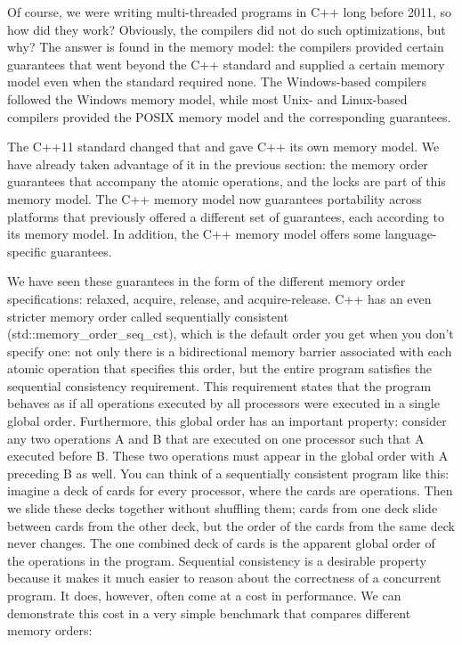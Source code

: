 Of course, we were writing multi-threaded programs in C++ long before 2011, so how did they work? Obviously, the compilers did not do such optimizations, but why? The answer is found in the memory model: the compilers provided certain guarantees that went beyond the C++ standard and supplied a certain memory model even when the standard required none. The Windows-based compilers followed the Windows memory model, while most Unix- and Linux-based compilers provided the POSIX memory model and the corresponding guarantees.

The C++11 standard changed that and gave C++ its own memory model. We have already taken advantage of it in the previous section: the memory order guarantees that accompany the atomic operations, and the locks are part of this memory model. The C++ memory model now guarantees portability across platforms that previously offered a different set of guarantees, each according to its memory model. In addition, the C++ memory model offers some language-specific guarantees.

We have seen these guarantees in the form of the different memory order specifications: relaxed, acquire, release, and acquire-release. C++ has an even stricter memory order called sequentially consistent (std::memory\_order\_seq\_cst), which is the default order you get when you don't specify one: not only there is a bidirectional memory barrier associated with each atomic operation that specifies this order, but the entire program satisfies the sequential consistency requirement. This requirement states that the program behaves as if all operations executed by all processors were executed in a single global order. Furthermore, this global order has an important property: consider any two operations A and B that are executed on one processor such that A executed before B. These two operations must appear in the global order with A preceding B as well. You can think of a sequentially consistent program like this: imagine a deck of cards for every processor, where the cards are operations. Then we slide these decks together without shuffling them; cards from one deck slide between cards from the other deck, but the order of the cards from the same deck never changes. The one combined deck of cards is the apparent global order of the operations in the program. Sequential consistency is a desirable property because it makes it much easier to reason about the correctness of a concurrent program. It does, however, often come at a cost in performance. We can demonstrate this cost in a very simple benchmark that compares different memory orders:

